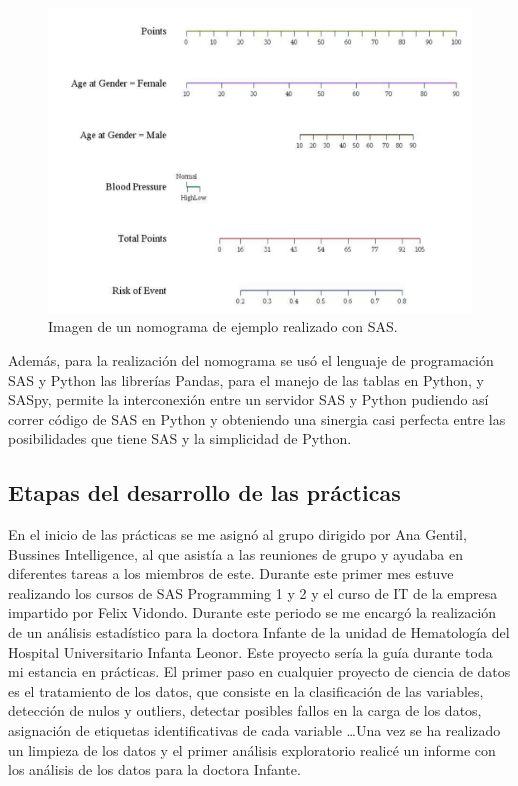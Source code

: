 \documentclass[pdftex,11pt,a4paper]{book}
\begin{document}
\begin{figure}
\begin{center}
\includegraphics[scale=0.35]{ejemplo_nomograma.png}
\caption{Imagen de un nomograma de ejemplo realizado con SAS.}
\label{fig:nomograma}
\end{center}
\end{figure}

Además, para la realización del nomograma se usó el lenguaje de programación SAS y Python las librerías Pandas, para el manejo de las tablas en Python, y SASpy, permite la interconexión entre un servidor SAS y Python pudiendo así correr código de SAS en Python y obteniendo una sinergia casi perfecta entre las posibilidades que tiene SAS y la simplicidad de Python. 


\subsection{Etapas del desarrollo de las prácticas}

En el inicio de las prácticas se me asignó al grupo dirigido por Ana Gentil, Bussines Intelligence, al que asistía a las reuniones de grupo y ayudaba en diferentes tareas a los miembros de este. Durante este primer mes estuve realizando los cursos de SAS Programming 1 y 2 y el curso de IT de la empresa impartido por Felix Vidondo. Durante este periodo se me encargó la realización de un análisis estadístico para la doctora Infante de la unidad de Hematología del Hospital Universitario Infanta Leonor. Este proyecto sería la guía durante toda mi estancia en prácticas. El primer paso en cualquier proyecto de ciencia de datos es el tratamiento de los datos, que consiste en la clasificación de las variables, detección de nulos y outliers, detectar posibles fallos en la carga de los datos, asignación de etiquetas identificativas de cada variable \ldots Una vez se ha realizado un limpieza de los datos y el primer análisis exploratorio realicé un informe con los análisis de los datos para la doctora Infante.  
\end{document}

